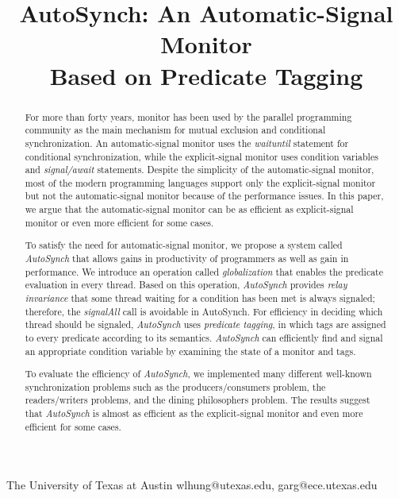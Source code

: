 \documentclass[preprint]{sigplanconf}
\begin{document}
\copyrightdata{[to be supplied]} 


\title{AutoSynch: An Automatic-Signal Monitor \\ Based on Predicate Tagging}
\subtitle{}

           {The University of Texas at Austin}
           {wlhung@utexas.edu, garg@ece.utexas.edu}

\maketitle

\begin{abstract}
For more than forty years, monitor has been used by the parallel programming 
community as the main mechanism for mutual exclusion and conditional 
synchronization. An 
automatic-signal monitor uses the {\em waituntil} statement for conditional 
synchronization, while the explicit-signal monitor uses condition variables and 
{\em signal/await} statements. Despite the simplicity of the automatic-signal monitor, 
most of the modern programming languages support only the explicit-signal 
monitor but not the automatic-signal monitor because of the performance issues. 
In this paper, we argue that the automatic-signal monitor can be as efficient 
as explicit-signal monitor or even more efficient for some cases.

To satisfy the need for automatic-signal monitor, we propose a system called 
{\em AutoSynch} that allows gains in productivity of 
programmers as well as gain in performance. We introduce an operation called
{\em globalization} that enables the predicate evaluation in
every thread. Based on this operation, {\em AutoSynch} provides {\em relay invariance}
that some thread waiting for a condition has been met is always signaled; 
therefore, the {\em signalAll} call is avoidable in AutoSynch. For efficiency in 
deciding which thread should be signaled, {\em AutoSynch} uses 
{\em predicate tagging}, in which tags are assigned to every predicate according
to its semantics. {\em AutoSynch} can efficiently find and signal an appropriate 
condition variable by examining the state of a monitor and tags. 

To evaluate the efficiency of {\em AutoSynch}, we implemented many different 
well-known synchronization problems such as the producers/consumers problem,
the readers/writers problems, and the dining philosophers problem. The results
suggest that {\em AutoSynch} is almost as efficient as the explicit-signal monitor
and even more efficient for some cases. 

\end{abstract}
\end{document}
